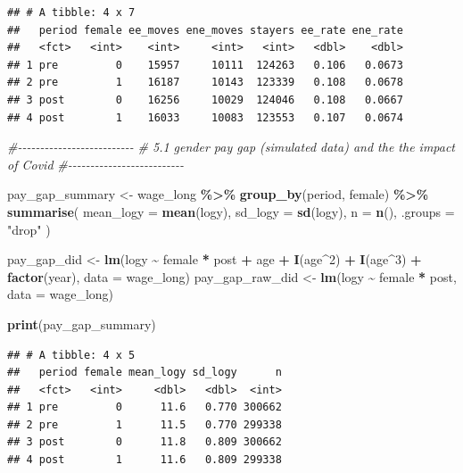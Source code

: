 \documentclass[
]{article}
\newenvironment{Shaded}{\begin{snugshade}}{\end{snugshade}}
\newcommand{\AttributeTok}[1]{\textcolor[rgb]{0.13,0.29,0.53}{#1}}
\newcommand{\CommentTok}[1]{\textcolor[rgb]{0.56,0.35,0.01}{\textit{#1}}}
\newcommand{\DecValTok}[1]{\textcolor[rgb]{0.00,0.00,0.81}{#1}}
\newcommand{\FunctionTok}[1]{\textcolor[rgb]{0.13,0.29,0.53}{\textbf{#1}}}
\newcommand{\NormalTok}[1]{#1}
\newcommand{\OtherTok}[1]{\textcolor[rgb]{0.56,0.35,0.01}{#1}}
\newcommand{\SpecialCharTok}[1]{\textcolor[rgb]{0.81,0.36,0.00}{\textbf{#1}}}
\newcommand{\StringTok}[1]{\textcolor[rgb]{0.31,0.60,0.02}{#1}}
\begin{document}
\begin{verbatim}
## # A tibble: 4 x 7
##   period female ee_moves ene_moves stayers ee_rate ene_rate
##   <fct>   <int>    <int>     <int>   <int>   <dbl>    <dbl>
## 1 pre         0    15957     10111  124263   0.106   0.0673
## 2 pre         1    16187     10143  123339   0.108   0.0678
## 3 post        0    16256     10029  124046   0.108   0.0667
## 4 post        1    16033     10083  123553   0.107   0.0674
\end{verbatim}

\begin{Shaded}
\begin{Highlighting}[]
\CommentTok{\#{-}{-}{-}{-}{-}{-}{-}{-}{-}{-}{-}{-}{-}{-}{-}{-}{-}{-}{-}{-}{-}{-}{-}{-}{-}{-}}
\CommentTok{\# 5.1 gender pay gap (simulated data) and the the impact of Covid}
\CommentTok{\#{-}{-}{-}{-}{-}{-}{-}{-}{-}{-}{-}{-}{-}{-}{-}{-}{-}{-}{-}{-}{-}{-}{-}{-}{-}{-}}

\NormalTok{pay\_gap\_summary }\OtherTok{\textless{}{-}}\NormalTok{ wage\_long }\SpecialCharTok{\%\textgreater{}\%}
    \FunctionTok{group\_by}\NormalTok{(period, female) }\SpecialCharTok{\%\textgreater{}\%}
    \FunctionTok{summarise}\NormalTok{(}
        \AttributeTok{mean\_logy =} \FunctionTok{mean}\NormalTok{(logy),}
        \AttributeTok{sd\_logy =} \FunctionTok{sd}\NormalTok{(logy),}
        \AttributeTok{n =} \FunctionTok{n}\NormalTok{(),}
        \AttributeTok{.groups =} \StringTok{"drop"}
\NormalTok{    )}

\NormalTok{pay\_gap\_did }\OtherTok{\textless{}{-}} \FunctionTok{lm}\NormalTok{(logy }\SpecialCharTok{\textasciitilde{}}\NormalTok{ female }\SpecialCharTok{*}\NormalTok{ post }\SpecialCharTok{+}\NormalTok{ age }\SpecialCharTok{+} \FunctionTok{I}\NormalTok{(age}\SpecialCharTok{\^{}}\DecValTok{2}\NormalTok{) }\SpecialCharTok{+} \FunctionTok{I}\NormalTok{(age}\SpecialCharTok{\^{}}\DecValTok{3}\NormalTok{) }\SpecialCharTok{+} \FunctionTok{factor}\NormalTok{(year), }\AttributeTok{data =}\NormalTok{ wage\_long)}
\NormalTok{pay\_gap\_raw\_did }\OtherTok{\textless{}{-}} \FunctionTok{lm}\NormalTok{(logy }\SpecialCharTok{\textasciitilde{}}\NormalTok{ female }\SpecialCharTok{*}\NormalTok{ post, }\AttributeTok{data =}\NormalTok{ wage\_long)}

\FunctionTok{print}\NormalTok{(pay\_gap\_summary)}
\end{Highlighting}
\end{Shaded}

\begin{verbatim}
## # A tibble: 4 x 5
##   period female mean_logy sd_logy      n
##   <fct>   <int>     <dbl>   <dbl>  <int>
## 1 pre         0      11.6   0.770 300662
## 2 pre         1      11.5   0.770 299338
## 3 post        0      11.8   0.809 300662
## 4 post        1      11.6   0.809 299338
\end{verbatim}
\end{document}
